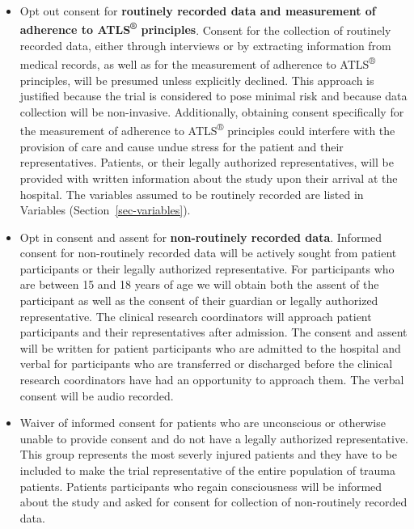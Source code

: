 \documentclass[
]{scrartcl}
\providecommand{\tightlist}{%
  \setlength{\itemsep}{0pt}\setlength{\parskip}{0pt}}\usepackage{longtable,booktabs,array}
\begin{document}
\begin{itemize}
\tightlist
\item
  Opt out consent for \textbf{routinely recorded data and measurement of
  adherence to ATLS\textsuperscript{®} principles}. Consent for the
  collection of routinely recorded data, either through interviews or by
  extracting information from medical records, as well as for the
  measurement of adherence to ATLS\textsuperscript{®} principles, will
  be presumed unless explicitly declined. This approach is justified
  because the trial is considered to pose minimal risk and because data
  collection will be non-invasive. Additionally, obtaining consent
  specifically for the measurement of adherence to
  ATLS\textsuperscript{®} principles could interfere with the provision
  of care and cause undue stress for the patient and their
  representatives. Patients, or their legally authorized
  representatives, will be provided with written information about the
  study upon their arrival at the hospital. The variables assumed to be
  routinely recorded are listed in Variables
  (Section~\ref{sec-variables}).
\item
  Opt in consent and assent for \textbf{non-routinely recorded data}.
  Informed consent for non-routinely recorded data will be actively
  sought from patient participants or their legally authorized
  representative. For participants who are between 15 and 18 years of
  age we will obtain both the assent of the participant as well as the
  consent of their guardian or legally authorized representative. The
  clinical research coordinators will approach patient participants and
  their representatives after admission. The consent and assent will be
  written for patient participants who are admitted to the hospital and
  verbal for participants who are transferred or discharged before the
  clinical research coordinators have had an opportunity to approach
  them. The verbal consent will be audio recorded.
\item
  Waiver of informed consent for patients who are unconscious or
  otherwise unable to provide consent and do not have a legally
  authorized representative. This group represents the most severly
  injured patients and they have to be included to make the trial
  representative of the entire population of trauma patients. Patients
  participants who regain consciousness will be informed about the study
  and asked for consent for collection of non-routinely recorded data.
\end{itemize}
\end{document}

